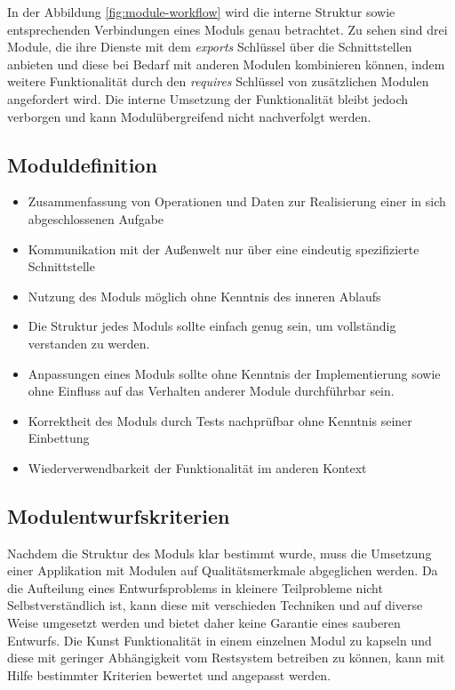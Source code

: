     \newline In der Abbildung \ref{fig:module-workflow} wird die interne Struktur sowie entsprechenden Verbindungen eines Moduls genau betrachtet. Zu sehen sind drei Module, die ihre Dienste mit dem \textit{exports} Schlüssel über die Schnittstellen anbieten und diese bei Bedarf mit anderen Modulen kombinieren können, indem weitere Funktionalität durch den \textit{requires} Schlüssel von zusätzlichen Modulen angefordert wird. Die interne Umsetzung der Funktionalität bleibt jedoch verborgen und kann Modulübergreifend nicht nachverfolgt werden. 

  \subsection{Moduldefinition}
    \begin{itemize}
      \item Zusammenfassung von Operationen und Daten zur Realisierung einer in sich abgeschlossenen Aufgabe 
      \item Kommunikation mit der Außenwelt nur über eine eindeutig spezifizierte Schnittstelle 
      \item Nutzung des Moduls möglich ohne Kenntnis des inneren Ablaufs 
      \item Die Struktur jedes Moduls sollte einfach genug sein, um vollständig verstanden zu werden.
      \item Anpassungen eines Moduls sollte ohne Kenntnis der Implementierung sowie ohne Einfluss auf das Verhalten anderer Module durchführbar sein.
      \item Korrektheit des Moduls durch Tests nachprüfbar ohne Kenntnis seiner Einbettung
      \item Wiederverwendbarkeit der Funktionalität im anderen Kontext
    \end{itemize}

  \subsection{Modulentwurfskriterien}
    Nachdem die Struktur des Moduls klar bestimmt wurde, muss die Umsetzung einer Applikation mit Modulen auf Qualitätsmerkmale abgeglichen werden. 
    Da die Aufteilung eines Entwurfsproblems in kleinere Teilprobleme nicht Selbstverständlich ist, kann diese mit verschieden Techniken und auf diverse Weise umgesetzt werden und bietet daher keine Garantie eines sauberen Entwurfs. 
    Die Kunst Funktionalität in einem einzelnen Modul zu kapseln und diese mit geringer Abhängigkeit vom Restsystem betreiben zu können, kann mit Hilfe bestimmter Kriterien bewertet und angepasst werden.
    
